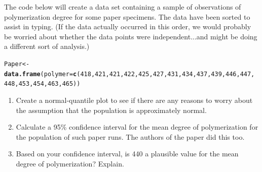 \documentclass[twoside]{book}\usepackage[]{graphicx}\usepackage[]{xcolor}
\makeatletter
\newcommand{\hlnum}[1]{\textcolor[rgb]{0.686,0.059,0.569}{#1}}%
\newcommand{\hlstd}[1]{\textcolor[rgb]{0.345,0.345,0.345}{#1}}%
\newcommand{\hlkwb}[1]{\textcolor[rgb]{0.69,0.353,0.396}{#1}}%
\newcommand{\hlkwc}[1]{\textcolor[rgb]{0.333,0.667,0.333}{#1}}%
\newcommand{\hlkwd}[1]{\textcolor[rgb]{0.737,0.353,0.396}{\textbf{#1}}}%
\newenvironment{kframe}{%
 \def\at@end@of@kframe{}%
 \ifinner\ifhmode%
  \def\at@end@of@kframe{\end{minipage}}%
  \begin{minipage}{\columnwidth}%
 \fi\fi%
 \def\FrameCommand##1{\hskip\@totalleftmargin \hskip-\fboxsep
 \colorbox{shadecolor}{##1}\hskip-\fboxsep
     \hskip-\linewidth \hskip-\@totalleftmargin \hskip\columnwidth}%
 \MakeFramed {\advance\hsize-\width
   \@totalleftmargin\z@ \linewidth\hsize
   \@setminipage}}%
 {\par\unskip\endMakeFramed%
 \at@end@of@kframe}
\newenvironment{knitrout}{}{} %
\makeatother
\begin{document}
\begin{problem}
	The code below will create a data set containing a sample of observations
	of polymerization degree for some paper specimens.  The data have been 
	sorted to assist in typing.  (If the data actually occurred in this order,
	we would probably be worried about whether the data points were independent...and might be doing a different sort of analysis.)
\begin{knitrout}
\color{fgcolor}\begin{kframe}
\begin{alltt}
\hlstd{Paper} \hlkwb{<-} \hlkwd{data.frame}\hlstd{(}\hlkwc{polymer} \hlstd{=} \hlkwd{c}\hlstd{(}\hlnum{418}\hlstd{,} \hlnum{421}\hlstd{,} \hlnum{421}\hlstd{,} \hlnum{422}\hlstd{,} \hlnum{425}\hlstd{,} \hlnum{427}\hlstd{,} \hlnum{431}\hlstd{,} \hlnum{434}\hlstd{,} \hlnum{437}\hlstd{,} \hlnum{439}\hlstd{,} \hlnum{446}\hlstd{,} \hlnum{447}\hlstd{,}
    \hlnum{448}\hlstd{,} \hlnum{453}\hlstd{,} \hlnum{454}\hlstd{,} \hlnum{463}\hlstd{,} \hlnum{465}\hlstd{))}
\end{alltt}
\end{kframe}
\end{knitrout}
	\begin{enumerate}
		\item Create a normal-quantile plot to see if there are any reasons
			to worry about the assumption that the population is approximately normal.
		\item
				Calculate 
				a 95\% confidence interval for the mean
				degree of polymerization for the population of such paper runs.
				The authors of the paper did this too.
		\item
			Based on your confidence interval, is 440 a plausible value
			for the mean degree of polymerization?  Explain.
	\end{enumerate}
\end{problem}
\end{document}
